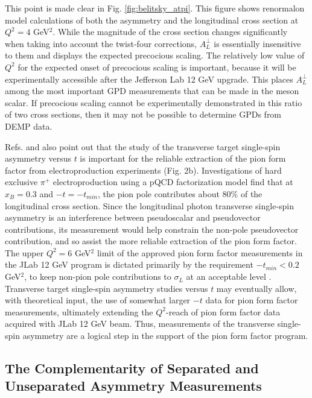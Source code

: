 \documentclass[preprint,superscriptaddress]{revtex4}
\begin{document}
This point is made clear in Fig. \ref{fig:belitsky_atpi}.  This figure shows
renormalon model calculations \cite{belitsky} of both the asymmetry and the
longitudinal cross section at $Q^2=4$ GeV$^2$.  While the magnitude of the
cross section changes significantly when taking into account the twist-four
corrections, $A_L^{\perp}$ is essentially insensitive to them and displays the
expected precocious scaling.  The relatively low value of $Q^2$ for the
expected onset of precocious scaling is important, because it will be
experimentally accessible after the Jefferson Lab 12 GeV upgrade.  This places
$A_L^{\perp}$ among the most important GPD measurements that can be made in the
meson scalar.  If precocious scaling cannot be experimentally demonstrated in
this ratio of two cross sections, then it may not be possible to determine
GPDs from DEMP data.

Refs. \cite{Go01} and \cite{Fr00} also point out that the study of the
transverse target single-spin asymmetry versus $t$ is important for the
reliable extraction of the pion form factor from electroproduction experiments
(Fig. 2b).  Investigations of hard exclusive $\pi^+$ electroproduction using a
pQCD factorization model \cite{Ma99,Ca90} find that at $x_B=0.3$ and
$-t=-t_{min}$, the pion pole contributes about 80\% of the longitudinal cross
section.  Since the longitudinal photon transverse single-spin asymmetry is an
interference between
pseudoscalar and pseudovector contributions, its measurement would help
constrain the non-pole pseudovector contribution, and so assist the more
reliable extraction of the pion form factor.  The upper $Q^2=6$ GeV$^2$ limit
of the approved pion form factor measurements in the JLab 12 GeV program
\cite{12GeV} is dictated primarily by the requirement $-t_{min}<0.2$ GeV$^2$,
to keep non-pion pole contributions to $\sigma_L$ at an acceptable level
\cite{Ca90}.  Transverse target single-spin asymmetry studies versus $t$ may
eventually allow, with theoretical input, the use of somewhat larger $-t$ data
for pion form factor measurements, ultimately extending the $Q^2$-reach of pion
form factor data acquired with JLab 12 GeV beam.  Thus, measurements of
the transverse single-spin asymmetry are a logical step in the support of the
pion form factor program.

\subsection{The Complementarity of Separated and Unseparated Asymmetry
  Measurements}
\end{document}
